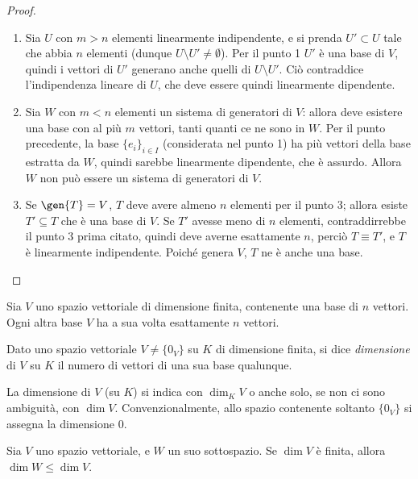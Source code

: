 \begin{proof}
\begin{enumerate}
		\item Sia $U$ con $m>n$ elementi linearmente indipendente, e si prenda $U'\subset U$ tale che abbia $n$ elementi (dunque $U\setminus U'\neq\emptyset$).
			Per il punto 1 $U'$ è una base di $V$, quindi i vettori di $U'$ generano anche quelli di $U\setminus U'$.
			Ciò contraddice l'indipendenza lineare di $U$, che deve essere quindi linearmente dipendente.
		\item Sia $W$ con $m<n$ elementi un sistema di generatori di $V$: allora deve esistere una base con al più $m$ vettori, tanti quanti ce ne sono in $W$.
			Per il punto precedente, la base $\{  e_i\}_{i\in I}$ (considerata nel punto 1) ha più vettori della base estratta da $W$, quindi sarebbe linearmente dipendente, che è assurdo.
			Allora $W$ non può essere un sistema di generatori di $V$.
		\item Se $\gen{T}=V$, $T$ deve avere almeno $n$ elementi per il punto 3; allora esiste $T'\subseteq T$ che è una base di $V$.
			Se $T'$ avesse meno di $n$ elementi, contraddirrebbe il punto 3 prima citato, quindi deve averne esattamente $n$, perciò $T\equiv T'$, e $T$ è linearmente indipendente.
			Poiché genera $V$, $T$ ne è anche una base.
	\end{enumerate}
\end{proof}
\begin{corollario}
	Sia $V$ uno spazio vettoriale di dimensione finita, contenente una base di $n$ vettori.
	Ogni altra base $V$ ha a sua volta esattamente $n$ vettori.
\end{corollario}
\begin{definizione} \label{d:dimensione}
	Dato uno spazio vettoriale $V\neq\{0_V\}$ su $K$ di dimensione finita, si dice \emph{dimensione} di $V$ su $K$ il numero di vettori di una sua base qualunque.
\end{definizione}
La dimensione di $V$ (su $K$) si indica con $\dim_KV$ o anche solo, se non ci sono ambiguità, con $\dim V$. Convenzionalmente, allo spazio contenente soltanto $\{0_V\}$ si assegna la dimensione 0.
\begin{teorema}
	Sia $V$ uno spazio vettoriale, e $W$ un suo sottospazio.
	Se $\dim V$ è finita, allora $\dim W\leq\dim V$.
\end{teorema}
